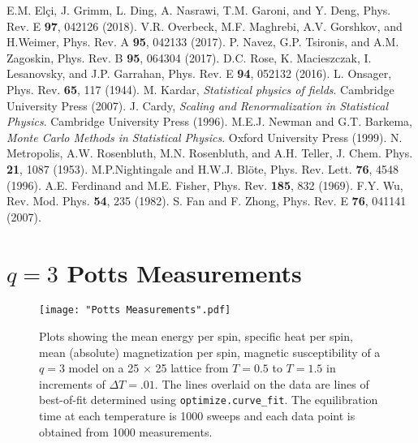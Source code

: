 \documentclass[twocolumn,aps]{revtex4-1} %
\begin{document}
\begin{thebibliography}{99}
	 E.M. Elçi, J. Grimm, L. Ding, A. Nasrawi, T.M. Garoni, and Y. Deng, Phys. Rev. E \textbf{97}, 042126 (2018).
	 V.R. Overbeck, M.F. Maghrebi, A.V. Gorshkov, and H.Weimer, Phys. Rev. A \textbf{95}, 042133 (2017).
	 P. Navez, G.P. Tsironis, and A.M. Zagoskin, Phys. Rev. B \textbf{95}, 064304 (2017).
	 D.C. Rose, K. Macieszczak, I. Lesanovsky, and J.P. Garrahan, Phys. Rev. E \textbf{94}, 052132 (2016).
	 L. Onsager, Phys. Rev. \textbf{65}, 117 (1944).
	 M. Kardar, \textit{Statistical physics of fields}. Cambridge University Press (2007).
	 J. Cardy, \textit{Scaling and Renormalization in Statistical Physics}. Cambridge University Press (1996).
	 M.E.J. Newman and G.T. Barkema, \textit{Monte Carlo Methods in Statistical Physics}. Oxford University Press (1999).
	 N. Metropolis, A.W. Rosenbluth, M.N. Rosenbluth, and A.H. Teller, J. Chem. Phys. \textbf{21}, 1087 (1953).
	 M.P.Nightingale and H.W.J. Blöte, Phys. Rev. Lett. \textbf{76}, 4548 (1996).
	 A.E. Ferdinand and M.E. Fisher, Phys. Rev. \textbf{185}, 832 (1969).
	 F.Y. Wu, Rev. Mod. Phys. \textbf{54}, 235 (1982).
	 S. Fan and F. Zhong, Phys. Rev. E \textbf{76}, 041141 (2007).
\end{thebibliography}

\clearpage

\appendix

\section{$q = 3$ Potts Measurements}
\begin{figure*}[b]
	\texttt{[image: "Potts Measurements".pdf]}
	\caption{\label{fig:q3potts}Plots showing the mean energy per spin, specific heat per spin, mean (absolute) magnetization per spin, magnetic susceptibility of a $q=3$ model on a 25 $\times$ 25 lattice from $T = 0.5$ to $T = 1.5$ in increments of $\Delta T = .01$. The lines overlaid on the data are lines of best-of-fit determined using \texttt{optimize.curve\_fit}. The equilibration time at each temperature is 1000 sweeps and each data point is obtained from 1000 measurements.}
\end{figure*}
\clearpage
\end{document}
